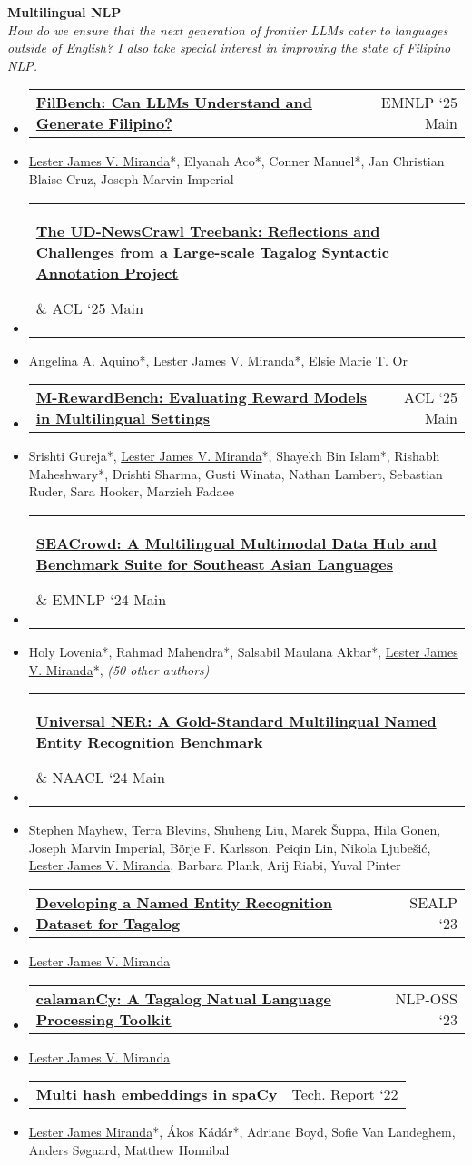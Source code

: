 \documentclass[a4paper,11pt]{article}
\makeatletter
\newcommand{\resumeItem}[1]{
  \item\small{
    {#1 \vspace{-2pt}}
  }
}
\newcommand{\resumeProjectHeading}[2]{
    \item
    \begin{tabular*}{0.97\textwidth}{l@{\extracolsep{\fill}}r}
      \small#1 & #2 \\
    \end{tabular*}\vspace{-7pt}
}
\newcommand{\resumeSubHeadingListStart}{\begin{itemize}[leftmargin=0.15in, label={}]}
\newcommand{\resumeSubHeadingListEnd}{\end{itemize}}
\makeatother
\begin{document}
\vspace{0.1em}
\textbf{Multilingual NLP}\\
\textit{How do we ensure that the next generation of frontier LLMs cater to languages outside of English? I also take special interest in improving the state of Filipino NLP.}
\resumeSubHeadingListStart
\resumeProjectHeading
{\href{https://arxiv.org/abs/2508.03523}{\textbf{FilBench: Can LLMs Understand and Generate Filipino?}}}{\small EMNLP `25 Main}
\resumeItem{\underline{Lester James V. Miranda}*, Elyanah Aco*, Conner Manuel*, Jan Christian Blaise Cruz, Joseph Marvin Imperial}
\resumeProjectHeading
{\parbox{0.80\textwidth}{\href{https://aclanthology.org/2025.acl-long.357/}{\textbf{The UD-NewsCrawl Treebank: Reflections and Challenges from a Large-scale Tagalog Syntactic Annotation Project}}}}{\small ACL `25 Main}
\resumeItem{Angelina A. Aquino*, \underline{Lester James V. Miranda}*, Elsie Marie T. Or}
\resumeProjectHeading
{\href{https://aclanthology.org/2025.acl-long.3/}{\textbf{M-RewardBench: Evaluating Reward Models in Multilingual Settings}}}{\small ACL `25 Main}
\resumeItem{Srishti Gureja*, \underline{Lester James V. Miranda}*, Shayekh Bin Islam*, Rishabh Maheshwary*, Drishti Sharma, Gusti Winata, Nathan Lambert, Sebastian Ruder, Sara Hooker, Marzieh Fadaee}
\resumeProjectHeading
{\parbox{0.80\textwidth}{\href{https://aclanthology.org/2024.emnlp-main.296/}{\textbf{SEACrowd: A Multilingual Multimodal Data Hub and Benchmark Suite for Southeast Asian Languages}}}}{\small EMNLP `24 Main}
\resumeItem{Holy Lovenia*, Rahmad Mahendra*, Salsabil Maulana Akbar*, \underline{Lester James V. Miranda}*, \textit{(50 other authors)}}
\resumeProjectHeading
{\parbox{0.70\textwidth}{\href{https://aclanthology.org/2024.naacl-long.243/}{\textbf{Universal NER: A Gold-Standard Multilingual Named Entity Recognition Benchmark}}}}{\small NAACL `24 Main}
\resumeItem{Stephen Mayhew, Terra Blevins, Shuheng Liu, Marek Šuppa, Hila Gonen, Joseph Marvin Imperial, Börje F. Karlsson, Peiqin Lin, Nikola Ljubešić, \underline{Lester James V. Miranda}, Barbara Plank, Arij Riabi, Yuval Pinter}
\resumeProjectHeading
{\href{https://aclanthology.org/2023.sealp-1.2/}{\textbf{Developing a Named Entity Recognition Dataset for Tagalog}}}{\small SEALP `23}
\resumeItem{\underline{Lester James V. Miranda}}
\resumeProjectHeading
{\href{https://aclanthology.org/2023.nlposs-1.1/}{\textbf{calamanCy: A Tagalog Natual Language Processing Toolkit}}}{\small NLP-OSS `23}
\resumeItem{\underline{Lester James V. Miranda}}
\resumeProjectHeading
{\href{https://arxiv.org/abs/2212.09255}{\textbf{Multi hash embeddings in spaCy}}}{\small Tech. Report `22}
\resumeItem{\underline{Lester James Miranda}*, Ákos Kádár*, Adriane Boyd, Sofie Van Landeghem, Anders Søgaard, Matthew Honnibal}
\resumeSubHeadingListEnd
\end{document}
